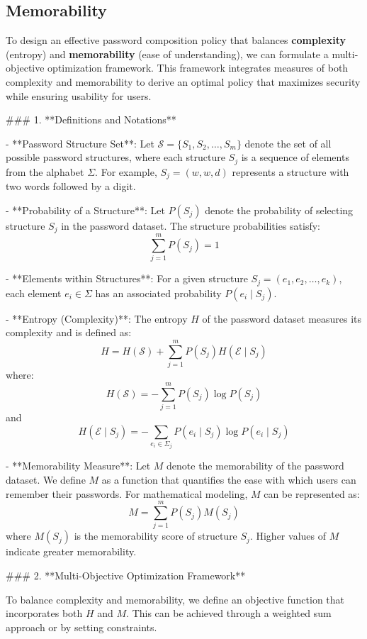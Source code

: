 \subsection{Memorability}

To design an effective password composition policy that balances \textbf{complexity} (entropy) and \textbf{memorability} (ease of understanding), we can formulate a multi-objective optimization framework. This framework integrates measures of both complexity and memorability to derive an optimal policy that maximizes security while ensuring usability for users.

### 1. **Definitions and Notations**

- **Password Structure Set**: Let \( \mathcal{S} = \{ S_1, S_2, \dots, S_m \} \) denote the set of all possible password structures, where each structure \( S_j \) is a sequence of elements from the alphabet \( \Sigma \). For example, \( S_j = (w, w, d) \) represents a structure with two words followed by a digit.

- **Probability of a Structure**: Let \( P(S_j) \) denote the probability of selecting structure \( S_j \) in the password dataset. The structure probabilities satisfy:
  \[
  \sum_{j=1}^{m} P(S_j) = 1
  \]

- **Elements within Structures**: For a given structure \( S_j = (e_1, e_2, \dots, e_k) \), each element \( e_i \in \Sigma \) has an associated probability \( P(e_i \mid S_j) \).

- **Entropy (Complexity)**: The entropy \( H \) of the password dataset measures its complexity and is defined as:
  \[
  H = H(\mathcal{S}) + \sum_{j=1}^{m} P(S_j) H(\mathcal{E} \mid S_j)
  \]
  where:
  \[
  H(\mathcal{S}) = - \sum_{j=1}^{m} P(S_j) \log P(S_j)
  \]
  and
  \[
  H(\mathcal{E} \mid S_j) = - \sum_{e_i \in \Sigma_j} P(e_i \mid S_j) \log P(e_i \mid S_j)
  \]

- **Memorability Measure**: Let \( M \) denote the memorability of the password dataset. We define \( M \) as a function that quantifies the ease with which users can remember their passwords. For mathematical modeling, \( M \) can be represented as:
  \[
  M = \sum_{j=1}^{m} P(S_j) M(S_j)
  \]
  where \( M(S_j) \) is the memorability score of structure \( S_j \). Higher values of \( M \) indicate greater memorability.

### 2. **Multi-Objective Optimization Framework**

To balance complexity and memorability, we define an objective function that incorporates both \( H \) and \( M \). This can be achieved through a weighted sum approach or by setting constraints.

